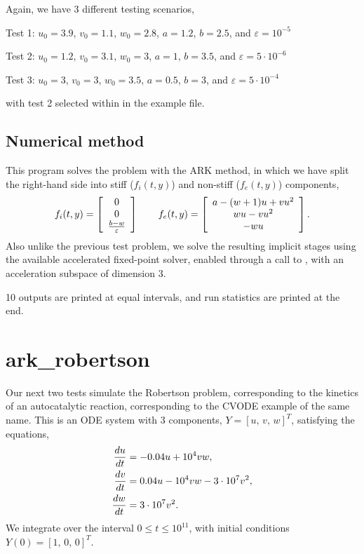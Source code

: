 \documentclass[letterpaper,10pt,english]{sphinxmanual}
\begin{document}
Again, we have 3 different testing scenarios,

Test 1:  $u_0=3.9$,  $v_0=1.1$,  $w_0=2.8$,
$a=1.2$, $b=2.5$, and $\varepsilon=10^{-5}$

Test 2:  $u_0=1.2$, $v_0=3.1$, $w_0=3$, $a=1$,
$b=3.5$, and $\varepsilon=5\cdot10^{-6}$

Test 3:  $u_0=3$, $v_0=3$, $w_0=3.5$, $a=0.5$,
$b=3$, and $\varepsilon=5\cdot10^{-4}$

with test 2 selected within in the example file.


\subsection{Numerical method}
\label{c_serial:id9}
This program solves the problem with the ARK method, in which we have
split the right-hand side into stiff ($f_i(t,y)$) and non-stiff
($f_e(t,y)$) components,
\begin{gather}
\begin{split}f_i(t,y) = \left[\begin{array}{c}
   0 \\ 0 \\ \frac{b-w}{\varepsilon}
\end{array}\right]
\qquad
f_e(t,y) = \left[\begin{array}{c}
   a - (w+1)u + v u^2 \\ w u - v u^2 \\ - w u
\end{array}\right].\end{split}\notag
\end{gather}
Also unlike the previous test problem, we solve the resulting implicit
stages using the available accelerated fixed-point solver, enabled
through a call to , with an acceleration
subspace of dimension 3.

10 outputs are printed at equal intervals, and run statistics
are printed at the end.


\section{ark\_robertson}
\label{c_serial:id10}\label{c_serial:ark-robertson}
Our next two tests simulate the Robertson problem, corresponding to the
kinetics of an autocatalytic reaction, corresponding to the CVODE
example of the same name.  This is an ODE system with 3
components, $Y = [u,\, v,\, w]^T$, satisfying the equations,
\begin{gather}
\begin{split}\frac{du}{dt} &= -0.04 u + 10^4 v w, \\
\frac{dv}{dt} &= 0.04 u - 10^4 v w - 3\cdot10^7 v^2, \\
\frac{dw}{dt} &= 3\cdot10^7 v^2.\end{split}\notag
\end{gather}
We integrate over the interval $0\le t\le 10^{11}$, with initial
conditions  $Y(0) = [1,\, 0,\, 0]^T$.
\end{document}
